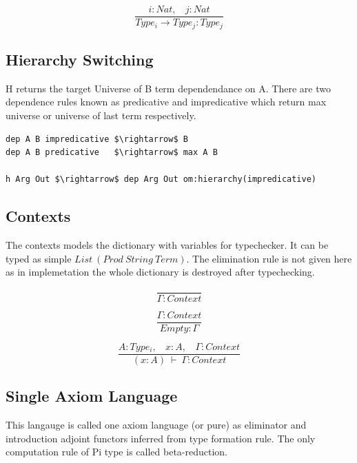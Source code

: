 \documentclass[11pt,oneside]{article}
\begin{document}
\begin{equation}
\tag{$R_2$}
\dfrac
{i : Nat,\ \ \ \ j : Nat}
{Type_i \rightarrow Type_{j} : Type_{j}}
\end{equation}

\subsection{Hierarchy Switching}
H returns the target Universe of B term dependendance on A. There are two dependence rules known
as predicative and impredicative which return max universe or universe of last term respectively.

\begin{lstlisting}[mathescape=true]
dep A B impredicative $\rightarrow$ B
dep A B predicative   $\rightarrow$ max A B

h Arg Out $\rightarrow$ dep Arg Out om:hierarchy(impredicative)
\end{lstlisting}

\subsection{Contexts}

The contexts models the dictionary with variables for typechecker.
It can be typed as simple $List\ (Prod\ String\ Term)$. The elimination
rule is not given here as in implemetation the whole dictionary
is destroyed after typechecking.

\begin{equation}
\tag{S}
\dfrac
{}
{\Gamma : Context}
\end{equation}

\begin{equation}
\tag{S}
\dfrac
{\Gamma : Context}
{Empty : \Gamma}
\end{equation}

\begin{equation}
\tag{S}
\dfrac
{A : Type_i,\ \ \ \ x : A,\ \ \ \ \Gamma : Context}
{(x : A)\ \vdash\ \Gamma : Context}
\end{equation}

\subsection{Single Axiom Language}

This langauge is called one axiom language (or pure) as eliminator
and introduction adjoint functors inferred from type formation rule.
The only computation rule of Pi type is called beta-reduction.
\end{document}
